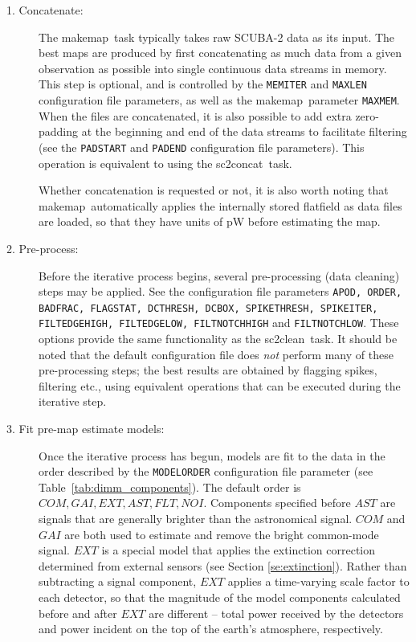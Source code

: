 \documentclass[twoside,11pt]{article}
\newcommand{\xref}[3]{#1}
\renewcommand{\_}{\texttt{\symbol{95}}}
\newcommand{\task}[1]{\textsf{#1}}
\newcommand{\makemap}{\xref{\task{makemap}}{sun258}{MAKEMAP}}
\newcommand{\clean}{\xref{\task{sc2clean}}{sun258}{SC2CLEAN}}
\newcommand{\concat}{\xref{\task{sc2concat}}{sun258}{SC2CONCAT}}
\newcommand{\aparam}[1]{\texttt{#1}}     %
\newcommand{\cparam}[1]{\texttt{#1}}     %
\begin{document}
\begin{description}

\item[1. Concatenate:] The \makemap\ task typically takes raw SCUBA-2
  data as its input. The best maps are produced by first concatenating
  as much data from a given observation as possible into single
  continuous data streams in memory. This step is optional, and is
  controlled by the \cparam{MEMITER} and \cparam{MAXLEN} configuration
  file parameters, as well as the \makemap\ parameter
  \aparam{MAXMEM}. When the files are concatenated, it is also
  possible to add extra zero-padding at the beginning and end of the
  data streams to facilitate filtering (see the \cparam{PADSTART} and
  \cparam{PADEND} configuration file parameters). This operation is
  equivalent to using the \concat\ task.

  Whether concatenation is requested or not, it is also worth noting
  that \makemap\ automatically applies the internally stored flatfield
  as data files are loaded, so that they have units of pW before
  estimating the map.

\item[2. Pre-process:] Before the iterative process begins, several
  pre-processing (data cleaning) steps may be applied. See the
  configuration file parameters \cparam{APOD, ORDER, BADFRAC,
    FLAGSTAT, DCTHRESH, DCBOX, SPIKETHRESH, SPIKEITER, FILT\_EDGEHIGH,
    FILT\_EDGELOW, FILT\_NOTCHHIGH} and \cparam{FILT\_NOTCHLOW}. These
  options provide the same functionality as the \clean\ task. It
  should be noted that the default configuration file does {\em not}
  perform many of these pre-processing steps; the best results are
  obtained by flagging spikes, filtering etc., using equivalent
  operations that can be executed during the iterative step.

\item[3. Fit pre-map estimate models:] Once the iterative process has
  begun, models are fit to the data in the order described by the
  \cparam{MODELORDER} configuration file parameter (see
  Table~\ref{tab:dimm_components}). The default order is $COM, GAI,
  EXT, AST, FLT, NOI$. Components specified before $AST$ are signals
  that are generally brighter than the astronomical signal. $COM$ and
  $GAI$ are both used to estimate and remove the bright common-mode
  signal. $EXT$ is a special model that applies the extinction
  correction determined from external sensors (see Section
  \ref{se:extinction}). Rather than subtracting a signal component,
  $EXT$ applies a time-varying scale factor to each detector, so that
  the magnitude of the model components calculated before and after
  $EXT$ are different -- total power received by the detectors and
  power incident on the top of the earth's atmosphere, respectively.


\end{description}
\end{document}
